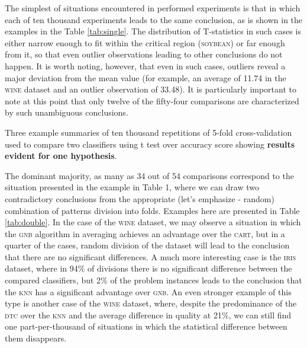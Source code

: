 \documentclass[final,3p,times,onecolumn]{elsarticle}
\begin{document}
The simplest of situations encountered in performed experiments is that in which each of ten thousand experiments leads to the same conclusion, as is shown in the examples in the Table \ref{tab:single}. The distribution of T-statistics in such cases is either narrow enough to fit within the critical region (\textsc{soybean}) or far enough from it, so that even outlier observations leading to other conclusions do not happen. It is worth noting, however, that even in such cases, outliers reveal a major deviation from the mean value (for example, an average of 11.74 in the \textsc{wine} dataset and an outlier observation of 33.48). It is particularly important to note at this point that only twelve of the fifty-four comparisons are characterized by such unambiguous conclusions.

\begin{table}[!h]
	\centering
	\caption{Three example summaries of ten thousand repetitions of 5-fold cross-validation used to compare two classifiers using t test over accuracy score showing \textbf{results evident for one hypothesis}.}
	\label{tab:single}
	\hspace{.03\textwidth}%
	\hspace{.03\textwidth}%
	
\end{table}


The dominant majority, as many as 34 out of 54 comparisons correspond to the situation presented in the example in Table 1, where we can draw two contradictory conclusions from the appropriate (let's emphasize - random) combination of patterns division into folds. Examples here are presented in Table \ref{tab:double}. In the case of the \textsc{wine} dataset, we may observe a situation in which the \textsc{gnb} algorithm in averaging achieves an advantage over the \textsc{cart}, but in a quarter of the cases, random division of the dataset will lead to the conclusion that there are no significant differences. A much more interesting case is the \textsc{iris} dataset, where in 94\% of divisions there is no significant difference between the compared classifiers, but 2\% of the problem instances leads to the conclusion that the \textsc{knn} has a significant advantage over \textsc{gnb}. An even stronger example of this type is another case of the \textsc{wine} dataset, where, despite the predominance of the \textsc{dtc} over the \textsc{knn} and the average difference in quality at 21\%, we can still find one part-per-thousand of situations in which the statistical difference between them disappears.
\end{document}
